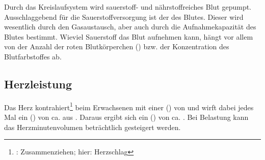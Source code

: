 Durch das Kreislaufsystem wird sauerstoff- und
nährstoffreiches Blut gepumpt. Ausschlaggebend für die
Sauerstoffversorgung ist der  des
Blutes. Dieser wird wesentlich durch den Gasaustausch, aber
auch durch die Aufnahmekapazität des Blutes bestimmt.
Wieviel Sauerstoff das Blut aufnehmen kann, hängt vor allem
von der Anzahl der roten Blutkörperchen ()
bzw. der Konzentration des Blutfarbstoffes 
ab.


\subsection{Herzleistung}

Das Herz kontrahiert\footnote{:
Zusammenziehen; hier: Herzschlag} beim Erwachsenen mit einer
 () von \PerMin* und wirft 
dabei jedes Mal ein  () von ca.
\Ml* aus
\cite{Silbernagl3-Herz,Silbernagl3-Kreislaufsystem}. Daraus
ergibt sich  ein  ()
von ca.
\LPerMin*.
Bei Belastung kann das Herzminutenvolumen beträchtlich
gesteigert werden.



% 
% 
% 
% 
% 
% 
% 

